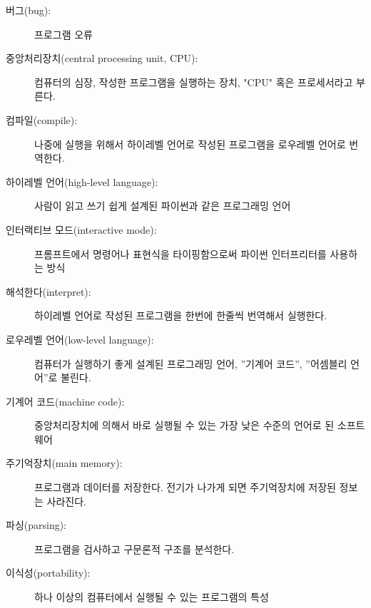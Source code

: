 \begin{description}

\item[버그(bug):]  프로그램 오류

\item[중앙처리장치(central processing unit, CPU):] 컴퓨터의 심장, 작성한 프로그램을 실행하는 장치, "CPU" 혹은 프로세서라고 부른다.

\item[컴파일(compile):]  나중에 실행을 위해서 하이레벨 언어로 작성된 프로그램을 로우레벨 언어로 번역한다.

\item[하이레벨 언어(high-level language):]  사람이 읽고 쓰기 쉽게 설계된 파이썬과 같은 프로그래밍 언어

\item[인터랙티브 모드(interactive mode):] 프롬프트에서 명령어나 표현식을 타이핑함으로써 파이썬 인터프리터를 사용하는 방식

\item[해석한다(interpret):] 하이레벨 언어로 작성된 프로그램을 한번에 한줄씩 번역해서 실행한다.

\item[로우레벨 언어(low-level language):] 컴퓨터가 실행하기 좋게 설계된 프로그래밍 언어, ''기계어 코드'', ''어셈블리 언어''로 불린다.

\item[기계어 코드(machine code):] 중앙처리장치에 의해서 바로 실행될 수 있는 가장 낮은 수준의 언어로 된 소프트웨어

\item[주기억장치(main memory):] 프로그램과 데이터를 저장한다. 전기가 나가게 되면 주기억장치에 저장된 정보는 사라진다.

\item[파싱(parsing):]  프로그램을 검사하고 구문론적 구조를 분석한다.

\item[이식성(portability):] 하나 이상의 컴퓨터에서 실행될 수 있는 프로그램의 특성


\end{description}
